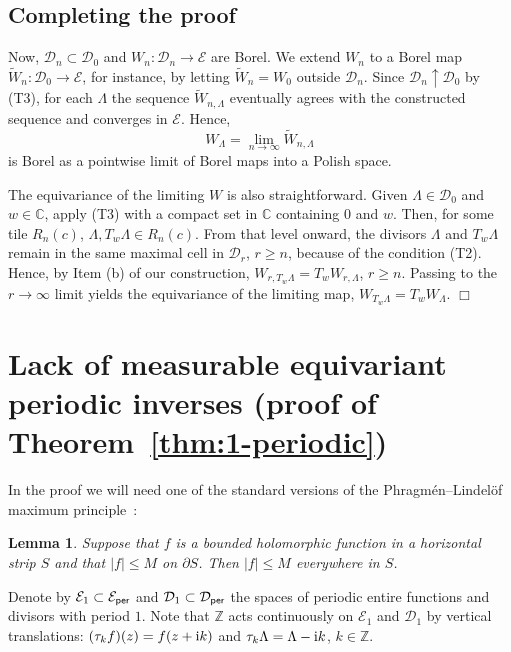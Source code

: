 \documentclass[11pt]{paper}
\newtheorem{lemma}{Lemma}
\newcommand{\bC}{\mathbb C}
\newcommand{\bZ}{\mathbb Z}
\newcommand{\cE}{\mathcal E}
\newcommand{\cD}{\mathcal D}
\begin{document}
\subsection{Completing the proof}
Now, $\cD_n \subset \cD_0$ and $W_n\colon \cD_n\to \cE$ are Borel. We extend $W_n$ to a Borel map
$\widetilde{W}_n\colon \cD_0\to\cE$, for instance, by letting $\widetilde{W}_n=W_0$ outside
$\cD_n$. Since $\cD_n\uparrow \cD_0$ by (T3), for each $\Lambda$ the sequence
$\widetilde{W}_{n, \Lambda}$ eventually agrees with the constructed sequence and
converges in $\cE$. Hence,
\[
W_\Lambda = \lim_{n\to\infty} \widetilde{W}_{n, \Lambda}
\]
is Borel as a pointwise limit of Borel maps into a Polish space.

\smallskip
The equivariance of the limiting $W$ is also straightforward. Given $\Lambda\in\cD_0$ and $w\in \bC$,
apply (T3) with a compact set in $\bC$ containing $0$ and $w$. Then, for some tile $R_n(c)$,
$\Lambda, T_w\Lambda\in R_n(c)$. From that level onward, the divisors $\Lambda$ and
$T_w \Lambda$ remain in the same
maximal cell in $\cD_r$, $r\ge n$, because of the condition (T2). Hence,
by Item (b) of our construction, $W_{r, T_w \Lambda} = T_w W_{r, \Lambda}$, $r\ge n$.  Passing to
the $r\to\infty$ limit yields the equivariance of the limiting map, $W_{T_w\Lambda} = T_w W_\Lambda$.
\hfill $\Box$



\section{Lack of measurable equivariant periodic inverses (proof of Theorem~\ref{thm:1-periodic})}

In the proof we will need one of the standard versions of the Phragm\'en--Lindel\"of maximum
principle~\cite[Section~7.3]{Marshall}:
\begin{lemma}\label{lemma:P-L}
Suppose that $f$ is a bounded holomorphic function in a horizontal strip $S$ and that
$|f|\le M$ on $\partial S$. Then $|f|\le M$ everywhere in $S$.
\end{lemma}

Denote by $\cE_1\subset \cE_{\sf per}$ and $\cD_1\subset \cD_{\sf per}$ the spaces of periodic entire functions and divisors with period $1$. Note that $\bZ$ acts continuously on $\cE_1$ and $\cD_1$ by
vertical translations: $(\tau_k f)(z)=f(z+{\rm i}k)$ and
$\tau_k \Lambda = \Lambda-{\rm i}k$, $k\in\bZ$.
\end{document}
